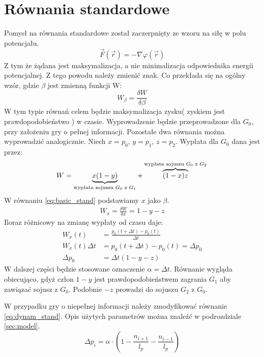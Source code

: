 \section{Równania standardowe}
\label{sec:r_stand}
Pomysł na równania standardowe został zaczerpnięty ze wzoru na siłę w polu potencjału.
\begin{equation}\label{eq:fiz_stand}
\overrightarrow{F}(\overrightarrow{r})=-\nabla \varphi (\overrightarrow{r})
\end{equation}
Z tym że żądana jest maksymalizacja, a nie minimalizacja odpowiednika energii potencjalnej. Z tego powodu należy zmienić znak. Co przekłada się na ogólny wzór, gdzie $\beta$ jest zmienną funkcji W:
\begin{equation}\label{eq:basic_stand}
W_\beta = \frac{\delta W}{\delta \beta}
\end{equation}
W tym typie równań celem będzie maksymalizacja zysku( zyskiem jest prawdopodobieństwo ) w czasie. Wyprowadzenie będzie przeprowadzone dla $G_0$, przy założeniu gry o pełnej informacji. Pozostałe dwa równania można wyprowadzić analogicznie. Niech $x=p_0$, $y=p_1$, $z=p_2$. Wypłata dla $G_0$ dana jest przez:
\begin{equation}\label{eq:wypl_stand}
W = \underbrace{x(1-y)}_{\text{wypłata sojuszu $G_0$ z $G_1$}} + \overbrace{(1-x)z}^{\text{wypłata sojuszu $G_0$ z $G_2$}} \\
\end{equation}
W równaniu \ref{eq:basic_stand} podstawiamy $x$ jako $\beta$.
\begin{align*}
W_x = \frac{\delta W}{\delta x} = 1-y-z
\end{align*}
Iloraz różnicowy na zmianę wypłaty od czasu daje:
\begin{align}\label{eq:dynam_stand}
W_x(t) &= \frac{p_0(t+\Delta t)-p_0(t)}{\Delta t} \nonumber\\
W_x(t) \Delta t &= p_0(t+\Delta t)-p_0(t) = \Delta p_0 \nonumber\\
\Delta p_0 &= \Delta t (1-y-z)
\end{align}
W dalszej części będzie stosowane oznaczenie $\alpha = \Delta t$. Równanie wygląda obiecująco, gdyż człon $1 - y$ jest prawdopodobieństwem zagrania $G_1$ aby zawiązać sojusz z $G_0$. Podobnie $-z$ prowadzi do sojuszu $G_2$ z $G_0$.

W przypadku gry o niepełnej informacji należy zmodyfikować równanie \ref{eq:dynam_stand}. Opis użytych parametrów można znaleźć w podrozdziale \ref{sec:model}.
\begin{equation} \label{eq:stand}
\Delta p_i = \alpha \cdot (1 - \frac{n_{i+1}}{l_p} - \frac{n_{i-1}}{l_p})
\end{equation}

